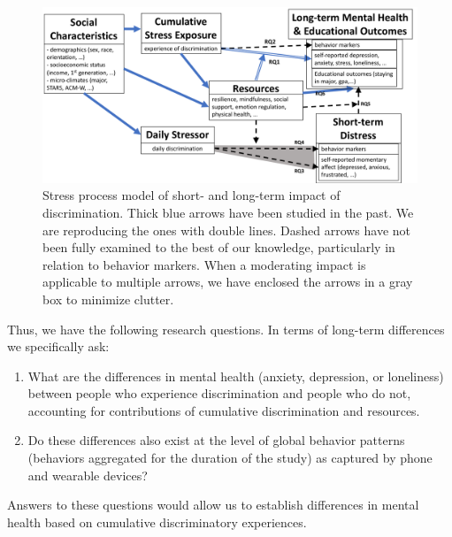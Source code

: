 \begin{figure}
    \centering
    \includegraphics[width=5.2in]{img/stress-process-model.png}
    \caption[Stress process model of discrimination]{Stress process model of short- and long-term impact of discrimination.  Thick blue arrows have been studied in the past. We are reproducing the ones with double lines. Dashed arrows have not been fully examined to the best of our knowledge, particularly in relation to behavior markers. When a moderating impact is applicable to multiple arrows, we have enclosed the arrows in a gray box to minimize clutter.
    }
    \label{fig:model}
\end{figure}

Thus, we have the following research questions. In terms of long-term differences we specifically ask: %

\begin{enumerate}[start=1,label={\bfseries RQ\arabic*}, leftmargin=1.5cm]
    \item \label{itm:rq-long-outcome} What are the differences in mental health (\eg anxiety, depression, or loneliness) between people who experience discrimination and people who do not, accounting for contributions of cumulative discrimination and resources.
    \item \label{itm:rq-long-behavior} Do these differences also exist at the level of global behavior patterns (\ie behaviors aggregated for the duration of the study) as captured by phone and  wearable devices?
\end{enumerate}

Answers to these questions would allow us to establish differences in mental health based on cumulative discriminatory experiences. 

